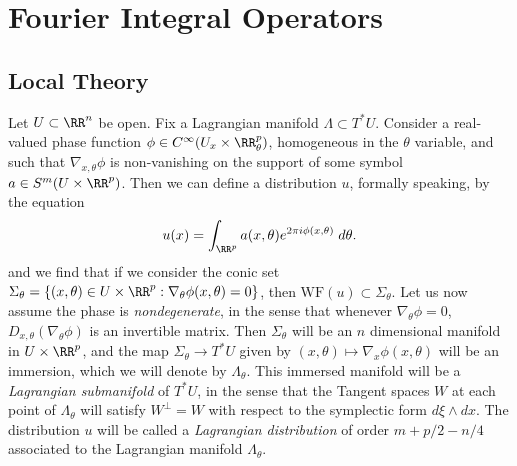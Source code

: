 \chapter{Fourier Integral Operators}

\section{Local Theory}

Let $U \subset \RR^n$ be open. Fix a Lagrangian manifold $\Lambda \subset T^* U$. Consider a real-valued phase function $\phi \in C^\infty(U_x \times \RR^p_\theta)$, homogeneous in the $\theta$ variable, and such that $\nabla_{x,\theta} \phi$ is non-vanishing on the support of some symbol $a \in S^m(U \times \RR^p)$. Then we can define a distribution $u$, formally speaking, by the equation
%
\[ u(x) = \int_{\RR^p} a(x,\theta) e^{2 \pi i \phi(x,\theta)}\; d\theta. \]
%
and we find that if we consider the conic set $\Sigma_\theta = \{ (x,\theta) \in U \times \RR^p : \nabla_\theta \phi(x,\theta) = 0 \}$, then $\text{WF}(u) \subset \Sigma_\theta$. Let us now assume the phase is \emph{nondegenerate}, in the sense that whenever $\nabla_\theta \phi = 0$, $D_{x,\theta} (\nabla_\theta \phi)$ is an invertible matrix. Then $\Sigma_\theta$ will be an $n$ dimensional manifold in $U \times \RR^p$, and the map $\Sigma_\theta \to T^* U$ given by $(x,\theta) \mapsto \nabla_x \phi(x,\theta)$ will be an immersion, which we will denote by $\Lambda_\theta$. This immersed manifold will be a \emph{Lagrangian submanifold} of $T^* U$, in the sense that the Tangent spaces $W$ at each point of $\Lambda_\theta$ will satisfy $W^\perp = W$ with respect to the symplectic form $d\xi \wedge dx$. The distribution $u$ will be called a \emph{Lagrangian distribution} of order $m + p/2 - n/4$ associated to the Lagrangian manifold $\Lambda_\theta$.















